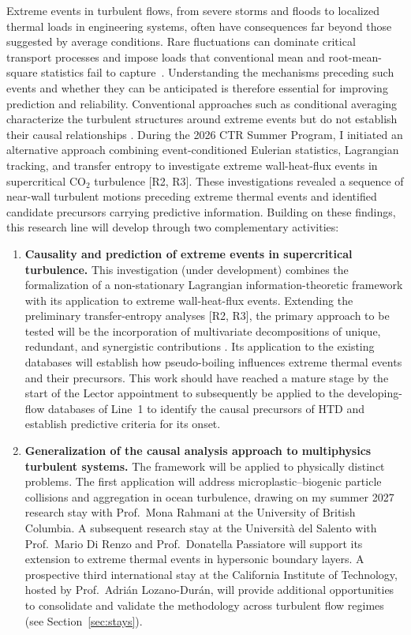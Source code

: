 \documentclass[11pt]{article}
\begin{document}
Extreme events in turbulent flows, from severe storms and floods to localized thermal loads in engineering systems, often have consequences far beyond those suggested by average conditions.
Rare fluctuations can dominate critical transport processes and impose loads that conventional mean and root-mean-square statistics fail to capture~\cite{Guerrero2020}.
Understanding the mechanisms preceding such events and whether they can be anticipated is therefore essential for improving prediction and reliability.
Conventional approaches such as conditional averaging characterize the turbulent structures around extreme events but do not establish their causal relationships \cite{Hack2021,Zhang2023}.
During the 2026 CTR Summer Program, I initiated an alternative approach combining event-conditioned Eulerian statistics, Lagrangian tracking, and transfer entropy to investigate extreme wall-heat-flux events in supercritical CO$_2$ turbulence [R2, R3].
These investigations revealed a sequence of near-wall turbulent motions preceding extreme thermal events and identified candidate precursors carrying predictive information.
Building on these findings, this research line will develop through two complementary activities:
\begin{enumerate}
	\item \textbf{Causality and prediction of extreme events in supercritical turbulence.}
	This investigation (under development) combines the formalization of a non-stationary Lagrangian information-theoretic framework with its application to extreme wall-heat-flux events.
	Extending the preliminary transfer-entropy analyses [R2, R3], the primary approach to be tested will be the incorporation of multivariate decompositions of unique, redundant, and synergistic contributions \cite{MartinezSanchez2024}.
	Its application to the existing databases will establish how pseudo-boiling influences extreme thermal events and their precursors.
	This work should have reached a mature stage by the start of the Lector appointment to subsequently be applied to the developing-flow databases of Line~1 to identify the causal precursors of HTD and establish predictive criteria for its onset.
	
	\item \textbf{Generalization of the causal analysis approach to multiphysics turbulent systems.}
	The framework will be applied to physically distinct problems.
	The first application will address microplastic--biogenic particle collisions and aggregation in ocean turbulence, drawing on my summer 2027 research stay with Prof.~Mona Rahmani at the University of British Columbia.
	A subsequent research stay at the Universit\`a del Salento with Prof.~Mario Di Renzo and Prof.~Donatella Passiatore will support its extension to extreme thermal events in hypersonic boundary layers.
	A prospective third international stay at the California Institute of Technology, hosted by Prof.~Adrián Lozano-Durán, will provide additional opportunities to consolidate and validate the methodology across turbulent flow regimes (see Section~\ref{sec:stays}).
\end{enumerate}
\end{document}

